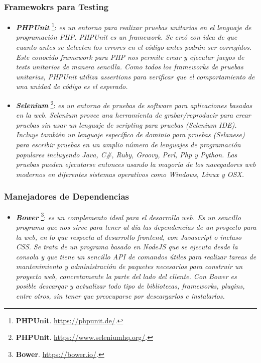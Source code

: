 \documentclass[11pt,oneside]{book}
\begin{document}
\subsubsection{Framewokrs para Testing}
\begin{itemize}
\item \textit{\textbf{PHPUnit}} \footnote{\textbf{PHPUnit}. \url{https://phpunit.de/}.}: \textit{es un entorno para realizar pruebas unitarias en el lenguaje de programación PHP. PHPUnit es un framework. Se creó con idea de que cuanto antes se detecten los errores en el código antes podrán ser corregidos. Este conocido framework para PHP nos permite crear y ejecutar juegos de tests unitarios de manera sencilla. Como todos los frameworks de pruebas unitarias, PHPUnit utiliza \textit{assertions} para verificar que el comportamiento de una unidad de código es el esperado.}

\item \textit{\textbf{Selenium}} \footnote{\textbf{PHPUnit}. \url{https://www.seleniumhq.org/}.}: \textit{es un entorno de pruebas de software para aplicaciones basadas en la web. Selenium provee una herramienta de grabar/reproducir para crear pruebas sin usar un lenguaje de scripting para pruebas (Selenium IDE). Incluye también un lenguaje específico de dominio para pruebas (Selanese) para escribir pruebas en un amplio número de lenguajes de programación populares incluyendo Java, C\#, Ruby, Groovy, Perl, Php y Python. Las pruebas pueden ejecutarse entonces usando la mayoría de los navegadores web modernos en diferentes sistemas operativos como Windows, Linux y OSX.}
\end{itemize}

\subsubsection{Manejadores de Dependencias}
\begin{itemize}
\item \textit{\textbf{Bower}} \footnote{\textbf{Bower}. \url{https://bower.io/}.}: \textit{es un complemento ideal para el desarrollo web. Es un sencillo programa que nos sirve para tener al día las dependencias de un proyecto para la web, en lo que respecta al desarrollo frontend, con Javascript o incluso CSS. Se trata de un programa basado en NodeJS que se ejecuta desde la consola y que tiene un sencillo API de comandos útiles para realizar tareas de mantenimiento y administración de paquetes necesarios para construir un proyecto web, concretamente la parte del lado del cliente. Con Bower es posible descargar y actualizar todo tipo de bibliotecas, frameworks, plugins, entre otros, sin tener que preocuparse por descargarlos e instalarlos.}
\end{itemize}
\end{document}
